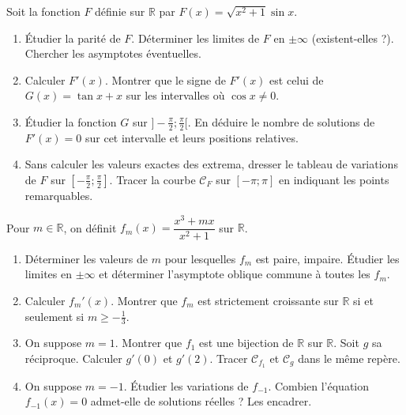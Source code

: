 \documentclass[11pt]{article}
\begin{document}
\begin{exercice}
Soit la fonction $F$ définie sur $\mathbb{R}$ par $F(x) = \sqrt{x^2 + 1} \sin x$.
\begin{enumerate}
    \item Étudier la parité de $F$. Déterminer les limites de $F$ en $\pm\infty$ (existent-elles ?). Chercher les asymptotes éventuelles.
    \item Calculer $F'(x)$. Montrer que le signe de $F'(x)$ est celui de $G(x) = \tan x + x$ sur les intervalles où $\cos x \neq 0$.
    \item Étudier la fonction $G$ sur $]-\frac{\pi}{2}; \frac{\pi}{2}[$. En déduire le nombre de solutions de $F'(x)=0$ sur cet intervalle et leurs positions relatives.
    \item Sans calculer les valeurs exactes des extrema, dresser le tableau de variations de $F$ sur $[-\frac{\pi}{2}; \frac{\pi}{2}]$. Tracer la courbe $\mathcal{C}_F$ sur $[-\pi; \pi]$ en indiquant les points remarquables.
\end{enumerate}
\end{exercice}

\begin{exercice}
Pour $m \in \mathbb{R}$, on définit $f_m(x) = \dfrac{x^3 + mx}{x^2 + 1}$ sur $\mathbb{R}$.
\begin{enumerate}
    \item Déterminer les valeurs de $m$ pour lesquelles $f_m$ est paire, impaire. Étudier les limites en $\pm\infty$ et déterminer l'asymptote oblique commune à toutes les $f_m$.
    \item Calculer $f_m'(x)$. Montrer que $f_m$ est strictement croissante sur $\mathbb{R}$ si et seulement si $m \ge -\frac{1}{3}$.
    \item On suppose $m = 1$. Montrer que $f_1$ est une bijection de $\mathbb{R}$ sur $\mathbb{R}$. Soit $g$ sa réciproque.
    Calculer $g'(0)$ et $g'(2)$. Tracer $\mathcal{C}_{f_1}$ et $\mathcal{C}_g$ dans le même repère.
    \item On suppose $m = -1$. Étudier les variations de $f_{-1}$. Combien l'équation $f_{-1}(x) = 0$ admet-elle de solutions réelles ? Les encadrer.
\end{enumerate}
\end{exercice}
\end{document}

